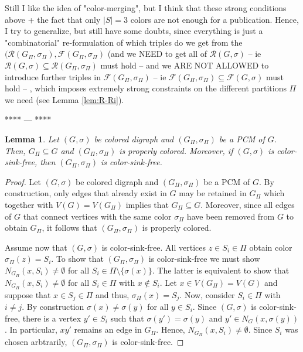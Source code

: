 \documentclass[final,3p,times]{elsarticle}
\newtheorem{lemma}[theorem]{Lemma}%
\begin{document}
{ Still I like the idea of "color-merging", but I think that these 
 strong conditions above + the fact that only $|S|=3$ colors are
  not enough for a publication. Hence, I try to generalize, 
 but still have some doubts, since everything is just a 
 "combinatorial" re-formulation of which triples do we get 
 from the $(\mathscr{R}(G_{\Pi},\sigma_{\Pi}),\mathscr{F}(G_{\Pi},\sigma_{\Pi})$
 (and we NEED to get all of $\mathscr{R}(G,\sigma)$ -- ie 
 $\mathscr{R}(G,\sigma)\subseteq \mathscr{R}(G_{\Pi},\sigma_{\Pi})$ must hold -- 
 and we ARE NOT ALLOWED to introduce further triples in 
 $\mathscr{F}(G_{\Pi},\sigma_{\Pi})$ -- ie
 $\mathscr{F}(G_{\Pi},\sigma_{\Pi}) \subseteq \mathscr{F}(G,\sigma)$ must hold --
 , which imposes
 extremely strong constraints on the different partitions $\Pi$
 we need (see Lemma \ref{lem:R-Ri}). 
\begin{center}**** --- **** \end{center}
}


\begin{lemma}\label{lem:basicsPCM}
  Let $(G,\sigma)$ be colored digraph and $(G_{\Pi},\sigma_{\Pi})$ 
  be a PCM of $G$. Then, $G_\Pi  \subseteq G$ and 
  $(G_{\Pi},\sigma_{\Pi})$ is properly colored. 
  Moreover, if $(G,\sigma)$ is color-sink-free, 
  then $(G_{\Pi},\sigma_{\Pi})$ is color-sink-free.
\end{lemma}
\begin{proof}
 	Let $(G,\sigma)$ be colored digraph and $(G_{\Pi},\sigma_{\Pi})$ 
  be a PCM of $G$. By construction, only edges that already
  exist in $G$ may be retained in $G_\Pi$ which together
  with $V(G) = V(G_\Pi)$ implies that $G_\Pi  \subseteq G$.
  Moreover, since all edges of $G$ that connect vertices 
  with the same color $\sigma_\Pi$ have been removed
  from $G$ to obtain $G_\Pi$, it follows that 
  $(G_{\Pi},\sigma_{\Pi})$ is properly colored. 
  
  Assume now that $(G,\sigma)$ is color-sink-free. 
  All vertices $z\in S_i\in \Pi$ obtain color
 $\sigma_\Pi(z)=S_i$. To show that $(G_\Pi,\sigma_\Pi)$ is color-sink-free we
	must show $N_{G_\Pi}(x,S_i)\neq \emptyset$ for all $S_i\in \Pi\setminus
	\{\sigma(x)\}$. The latter is equivalent to show that $N_{G_\Pi}(x,S_i)\neq
	\emptyset$ for all $S_i\in \Pi$ with $x\notin S_i$. Let $x\in V(G_\Pi)=V(G)$
	and suppose that $x\in S_j\in \Pi$ and thus, $\sigma_\Pi(x) = S_j$. Now,
	consider $S_i\in \Pi$ with $i\neq j$. By construction $\sigma(x)\neq
	\sigma(y)$ for all $y\in S_i$. Since $(G,\sigma)$ is color-sink-free, there
	is a vertex $y'\in S_i$ such that $\sigma(y')=\sigma(y)$ and $y'\in
	N_G(x,\sigma(y))$. In particular, $xy'$ remains an edge in $G_\Pi$. Hence,
	$N_{G_\Pi}(x,S_i)\neq \emptyset$. Since $S_i$ was chosen arbtrarily,
	$(G_\Pi,\sigma_\Pi)$ is color-sink-free.
 \end{proof}
\end{document}
